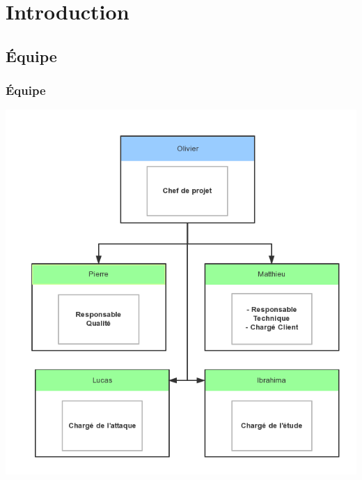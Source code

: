 \section{Introduction}
\subsection{Équipe}
\begin{frame}
    \frametitle{\color{white}Équipe}
  \begin{center}
    \includegraphics[scale=0.30]{guipgteam.png}
  \end{center}
\end{frame}
% 
